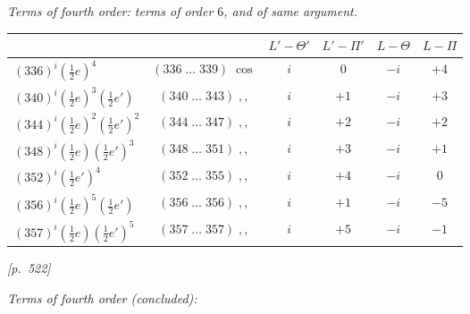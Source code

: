\documentclass[11pt]{article}
\begin{document}
\medskip

\textit{Terms of fourth order: terms of order $6$, and of same argument.}

\smallskip

\begin{center}
\begin{tabular}{|l|c|c|c|c|c|}
\hline
 & & $L'-\Theta'$ & $L'-\Pi'$ & $L-\Theta$ & $L-\Pi$ \\
\hline
$(336)^i(\tfrac{1}{2}e)^4$ & $(336\;\ldots\;339)\;\cos$ & $i$ & $0$ & $-i$ & $+4$ \\
$(340)^i(\tfrac{1}{2}e)^3(\tfrac{1}{2}e')$ & $(340\;\ldots\;343)\;,,$ & $i$ & $+1$ & $-i$ & $+3$ \\
$(344)^i(\tfrac{1}{2}e)^2(\tfrac{1}{2}e')^2$ & $(344\;\ldots\;347)\;,,$ & $i$ & $+2$ & $-i$ & $+2$ \\
$(348)^i(\tfrac{1}{2}e)(\tfrac{1}{2}e')^3$ & $(348\;\ldots\;351)\;,,$ & $i$ & $+3$ & $-i$ & $+1$ \\
$(352)^i(\tfrac{1}{2}e')^4$ & $(352\;\ldots\;355)\;,,$ & $i$ & $+4$ & $-i$ & $0$ \\
$(356)^i(\tfrac{1}{2}e)^5(\tfrac{1}{2}e')$ & $(356\;\ldots\;356)\;,,$ & $i$ & $+1$ & $-i$ & $-5$ \\
$(357)^i(\tfrac{1}{2}e)(\tfrac{1}{2}e')^5$ & $(357\;\ldots\;357)\;,,$ & $i$ & $+5$ & $-i$ & $-1$ \\
\hline
\end{tabular}
\end{center}


\newpage
\noindent\textit{[p.~522]}

\medskip

\begin{center}
\textit{Terms of fourth order (concluded):}
\end{center}

\smallskip
\end{document}

